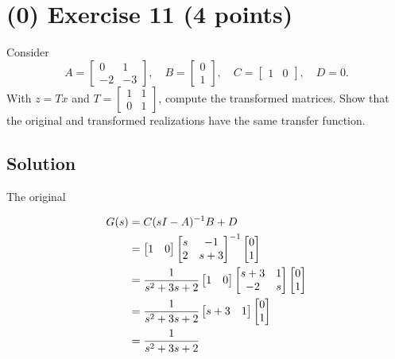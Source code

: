 \documentclass[12pt,a4paper]{article}
\begin{document}
\vspace{3cm}
\clearpage
\section*{(0) Exercise 11 \hfill {\normalsize (4 points)}}
Consider
\[
A=\begin{bmatrix}0&1\\-2&-3\end{bmatrix},\quad
B=\begin{bmatrix}0\\1\end{bmatrix},\quad C=\begin{bmatrix}1&0\end{bmatrix},\quad D=0.
\]
With $z=Tx$ and $T=\begin{bmatrix}1&1\\0&1\end{bmatrix}$, compute the transformed matrices. Show that the original and transformed realizations have the same transfer function.
\subsection*{Solution}

The original 

 \begin{align*}
 	G(s) &= C(sI - A)^{-1}B + D \\
 	&= \begin{bmatrix}
 		1 & 0
 	\end{bmatrix} \begin{bmatrix}
 	s & -1 \\
 	2 & s + 3
 	\end{bmatrix}^{-1} \begin{bmatrix}
 	0 \\ 1
 	\end{bmatrix} \\
 	&=  {1\over s^2 + 3s + 2} \begin{bmatrix}
 		1 & 0
 	\end{bmatrix} \begin{bmatrix}
 	s +3 & 1 \\ -2 & s
 	\end{bmatrix} \begin{bmatrix}
 	0 \\ 1
 	\end{bmatrix} \\
	&= {1 \over s^2 + 3s + 2} \begin{bmatrix}
		s + 3 & 1 
	\end{bmatrix} \begin{bmatrix}
	0 \\ 1
	\end{bmatrix} \\
	&= {1 \over s^2 + 3s + 2}	
 \end{align*}
\end{document}
